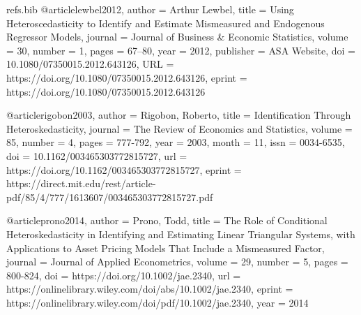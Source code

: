 \begin{filecontents}[force]{refs.bib}
@article{lewbel2012,
author = {Arthur Lewbel},
title = {Using Heteroscedasticity to Identify and Estimate Mismeasured and Endogenous Regressor Models},
journal = {Journal of Business \& Economic Statistics},
volume = {30},
number = {1},
pages = {67--80},
year = {2012},
publisher = {ASA Website},
doi = {10.1080/07350015.2012.643126},
URL = {https://doi.org/10.1080/07350015.2012.643126},
eprint = {https://doi.org/10.1080/07350015.2012.643126}
}

@article{rigobon2003,
    author = {Rigobon, Roberto},
    title = {Identification Through Heteroskedasticity},
    journal = {The Review of Economics and Statistics},
    volume = {85},
    number = {4},
    pages = {777-792},
    year = {2003},
    month = {11},
    issn = {0034-6535},
    doi = {10.1162/003465303772815727},
    url = {https://doi.org/10.1162/003465303772815727},
    eprint = {https://direct.mit.edu/rest/article-pdf/85/4/777/1613607/003465303772815727.pdf}
}

@article{prono2014,
author = {Prono, Todd},
title = {The Role of Conditional Heteroskedasticity in Identifying and Estimating Linear Triangular Systems, with Applications to Asset Pricing Models That Include a Mismeasured Factor},
journal = {Journal of Applied Econometrics},
volume = {29},
number = {5},
pages = {800-824},
doi = {https://doi.org/10.1002/jae.2340},
url = {https://onlinelibrary.wiley.com/doi/abs/10.1002/jae.2340},
eprint = {https://onlinelibrary.wiley.com/doi/pdf/10.1002/jae.2340},
year = {2014}
}
\end{filecontents}

\documentclass{article}
\usepackage[utf8]{inputenc}
\usepackage{mathtools}
\usepackage{amsmath}
\usepackage{amsthm}
\usepackage{amssymb}
\usepackage{geometry}
\geometry{verbose}
\usepackage[backend=biber, style=authoryear]{biblatex}


\usepackage{enumitem}
\usepackage{hyperref}


\makeatletter
\newcommand{\E}{\mathbb{E}}
\newcommand{\cov}{\operatorname{Cov}}
\newcommand{\corr}{\operatorname{Corr}}
\newcommand{\var}{\operatorname{Var}}
\newcommand{\plim}{\operatorname*{plim}}
\newcommand{\argmin}{\operatorname*{arg\,min}}

\theoremstyle{plain}
\newtheorem{theorem}{Theorem}\newtheorem{remark}{Remark}
\newtheorem{cor}{Corollary}[section]

